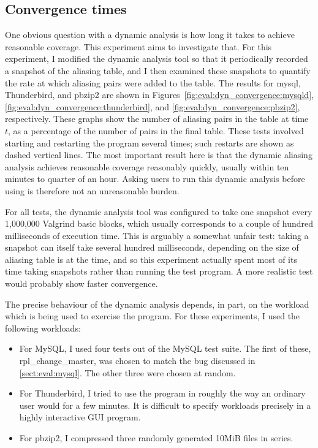 \subsection{Convergence times}

One obvious question with a dynamic analysis is how long it takes to
achieve reasonable coverage.  This experiment aims to investigate
that.  For this experiment, I modified the dynamic analysis tool so
that it periodically recorded a snapshot of the aliasing table, and I
then examined these snapshots to quantify the rate at which aliasing
pairs were added to the table.  The results for mysql, Thunderbird,
and pbzip2 are shown in Figures~\ref{fig:eval:dyn_convergence:mysqld},
\ref{fig:eval:dyn_convergence:thunderbird}, and
\ref{fig:eval:dyn_convergence:pbzip2}, respectively.  These graphs
show the number of aliasing pairs in the table at time $t$, as a
percentage of the number of pairs in the final table.  These tests
involved starting and restarting the program several times; such
restarts are shown as dashed vertical lines.  The most important
result here is that the dynamic aliasing analysis achieves reasonable
coverage reasonably quickly, usually within ten minutes to quarter of
an hour.  Asking users to run this dynamic analysis before using
{\technique} is therefore not an unreasonable burden.

For all tests, the dynamic analysis tool was configured to take one
snapshot every 1,000,000 Valgrind basic blocks, which usually
corresponds to a couple of hundred milliseconds of execution
time. This is arguably a somewhat unfair test: taking a snapshot can
itself take several hundred milliseconds, depending on the size of
aliasing table is at the time, and so this experiment actually spent
most of its time taking snapshots rather than running the test
program.  A more realistic test would probably show faster
convergence.

The precise behaviour of the dynamic analysis depends, in part, on the
workload which is being used to exercise the program.  For these
experiments, I used the following workloads:

\begin{itemize}
\item For MySQL, I used four tests out of the MySQL test suite. The
  first of these, rpl\_change\_master, was chosen to match the bug
  discussed in \autoref{sect:eval:mysql}.  The other three were chosen
  at random.
\item For Thunderbird, I tried to use the program in roughly the way
  an ordinary user would for a few minutes.  It is difficult to
  specify workloads precisely in a highly interactive GUI
  program.
\item For pbzip2, I compressed three randomly generated 10MiB files in
  series.
\end{itemize}

